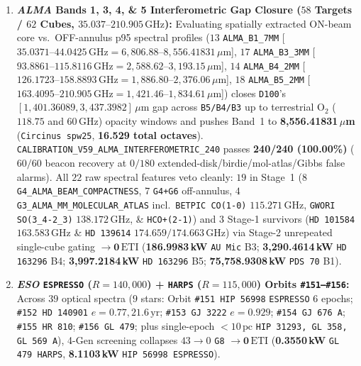 \documentclass[twocolumn,10pt]{article}
\begin{document}
\begin{enumerate}
  \item \textbf{\textit{ALMA} Bands 1, 3, 4, \& 5 Interferometric Gap Closure ($58$ Targets / $62$ Cubes, $35.037\text{--}210.905\,\text{GHz}$):} Evaluating spatially extracted ON-beam core vs.\ OFF-annulus p95 spectral profiles ($13$ \texttt{ALMA\_B1\_7MM} [$35.0371\text{--}44.0425\,\text{GHz} = 6{,}806.88\text{--}8{,}556.41831\,\mu\text{m}$], $17$ \texttt{ALMA\_B3\_3MM} [$93.8861\text{--}115.8116\,\text{GHz} = 2{,}588.62\text{--}3{,}193.15\,\mu\text{m}$], $14$ \texttt{ALMA\_B4\_2MM} [$126.1723\text{--}158.8893\,\text{GHz} = 1{,}886.80\text{--}2{,}376.06\,\mu\text{m}$], $18$ \texttt{ALMA\_B5\_2MM} [$163.4095\text{--}210.905\,\text{GHz} = 1{,}421.46\text{--}1{,}834.61\,\mu\text{m}$]) closes \texttt{D100}'s $[1{,}401.36089,\allowbreak 3{,}437.3982]\,\mu\text{m}$ gap across \texttt{B5/B4/B3} up to terrestrial $\mathrm{O_2}$ ($118.75$ and $60\,\text{GHz}$) opacity windows and pushes Band~1 to \textbf{8,556.41831\,$\mu$m} (\texttt{Circinus spw25}, \textbf{16.529 total octaves}). \texttt{CALIBRATION\_V59\_ALMA\_INTERFEROMETRIC\_240} passes \textbf{240/240 (100.00\%)} ($60/60$ beacon recovery at $0/180$ extended-disk/birdie/mol-atlas/Gibbs false alarms). All $22$ raw spectral features veto cleanly: $19$ in Stage~1 ($8$ \texttt{G4\_ALMA\_BEAM\_COMPACTNESS}, $7$ \texttt{G4+G6} off-annulus, $4$ \texttt{G3\_ALMA\_MM\_MOLECULAR\_ATLAS} incl.\ \texttt{BETPIC CO(1-0)} $115.271\,\text{GHz}$, \texttt{GWORI SO(3\_4-2\_3)} $138.172\,\text{GHz}$, \& \texttt{HCO+(2-1)}) and $3$ Stage-1 survivors (\texttt{HD\,101584} $163.583\,\text{GHz}$ \& \texttt{HD\,139614} $174.659/174.663\,\text{GHz}$) via Stage-2 unrepeated single-cube gating $\rightarrow \mathbf{0\,\mathrm{ETI}}$ (\textbf{186.9983\,kW} \texttt{AU\,Mic} B3; \textbf{3,290.4614\,kW} \texttt{HD\,163296} B4; \textbf{3,997.2184\,kW} \texttt{HD\,163296} B5; \textbf{75,758.9308\,kW} \texttt{PDS\,70} B1).
  \item \textbf{\textit{ESO} \texttt{ESPRESSO} ($R=140{,}000$) + \texttt{HARPS} ($R=115{,}000$) Orbits \texttt{\#151--\#156}:} Across $39$ optical spectra ($9$ stars: Orbit \texttt{\#151 HIP\,56998} \texttt{ESPRESSO} $6$ epochs; \texttt{\#152 HD\,140901} $e=0.77, 21.6\,\text{yr}$; \texttt{\#153 GJ\,3222} $e=0.929$; \texttt{\#154 GJ\,676\,A}; \texttt{\#155 HR\,810}; \texttt{\#156 GL\,479}; plus single-epoch $<10\,\text{pc}$ \texttt{HIP\,31293, GL\,358, GL\,569\,A}), 4-Gen screening collapses $43\rightarrow 0$ \texttt{G8} $\rightarrow \mathbf{0\,\mathrm{ETI}}$ (\textbf{0.3550\,kW} \texttt{GL\,479 HARPS}, \textbf{8.1103\,kW} \texttt{HIP\,56998 ESPRESSO}).

\end{enumerate}
\end{document}
